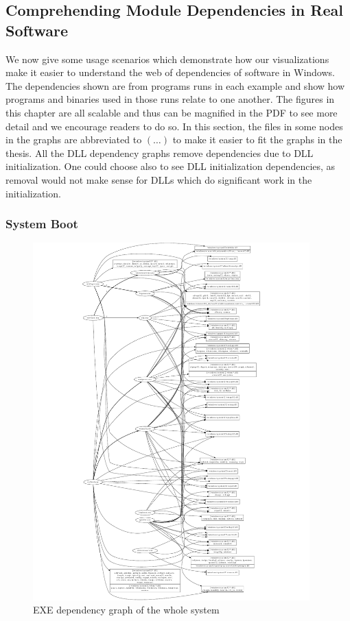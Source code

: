 \subsection{Comprehending Module Dependencies in Real Software}
\label{sec:apply}

We now give some usage scenarios which demonstrate how our visualizations
make it easier to understand the web of dependencies of software in Windows.
The dependencies shown are from programs runs in each
example and show how programs and binaries used in those runs
relate to one another.
The figures in this chapter are all scalable and thus can be magnified
in the PDF to see more detail and we encourage readers to do so.
In this section,
the files in some nodes in the graphs are abbreviated to $(\ldots)$ to make
it easier to fit the graphs in the thesis.
All the DLL dependency graphs remove dependencies due to
DLL initialization.
One could choose also to see DLL initialization dependencies, as removal
would not make sense for DLLs which do significant work in the initialization.

\subsubsection{System Boot}
\label{sec:apply:boot}

\begin{figure}[htbp]
\centering
\includegraphics[keepaspectratio,width=0.95\textwidth,height=0.95\textheight]{depvis/boot-gdll.pdf}
\caption{EXE dependency graph of the whole system}
\label{fig:boot}
\end{figure}

